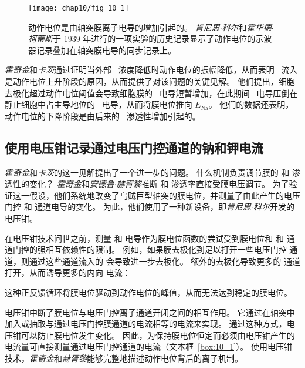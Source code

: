 \begin{figure}[htbp]
	\centering
	\texttt{[image: chap10/fig\_10\_1]}
	\caption{动作电位是由轴突膜离子电导的增加引起的。
		\textit{肯尼思$\cdot$科尔}和\textit{霍华德$\cdot$柯蒂斯}于 1939 年进行的一项实验的历史记录显示了动作电位的示波器记录叠加在轴突膜电导的同步记录上。}
	\label{fig:10_1}
\end{figure}


\textit{霍奇金}和\textit{卡茨}通过证明当外部~ 浓度降低时动作电位的振幅降低，从而表明~ 流入是动作电位上升阶段的原因，从而提供了对该问题的关键见解。
他们提出，细胞去极化超过动作电位阈值会导致细胞膜的~ 电导短暂增加，在此期间~ 电导压倒在静止细胞中占主导地位的~ 电导，从而将膜电位推向 $E_{\text{Na}}$。
他们的数据还表明，动作电位的下降阶段是由后来的~ 渗透性增加引起的。



\subsection{使用电压钳记录通过电压门控通道的钠和钾电流}

\textit{霍奇金}和\textit{卡茨}的这一见解提出了一个进一步的问题。
什么机制负责调节膜的  和  渗透性的变化？
\textit{霍奇金}和\textit{安德鲁$\cdot$赫胥黎}推断  和  渗透率直接受膜电压调节。
为了验证这一假设，他们系统地改变了乌贼巨型轴突的膜电位，并测量了由此产生的电压门控  和  通道电导的变化。
为此，他们使用了一种新设备，即\textit{肯尼思$\cdot$科尔}开发的电压钳。



在电压钳技术问世之前，测量  和  电导作为膜电位函数的尝试受到膜电位和  和  通道门控的强相互依赖性的限制。
例如，如果膜去极化到足以打开一些电压门控  通道，则通过这些通道流入的  会导致进一步去极化。 
额外的去极化导致更多的  通道打开，从而诱导更多的内向  电流：


这种正反馈循环将膜电位驱动到动作电位的峰值，从而无法达到稳定的膜电位。


电压钳中断了膜电位与电压门控离子通道开闭之间的相互作用。
它通过在轴突中加入或抽取与通过电压门控膜通道的电流相等的电流来实现。
通过这种方式，电压钳可以防止膜电位发生变化。
因此，为保持膜电位恒定而必须由电压钳产生的电流量可直接测量通过电压门控通道的电流（文本框~\ref{box:10_1}）。
使用电压钳技术，\textit{霍奇金}和\textit{赫胥黎}能够完整地描述动作电位背后的离子机制。


